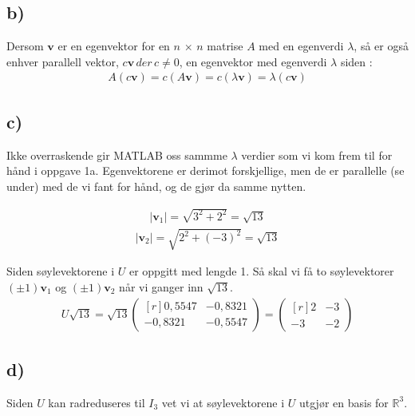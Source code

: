 \documentclass[11pt]{article}
\renewcommand{\vec}[1]{\mathbf{#1}}
\newcommand{\bpm}{\begin{pmatrix*}[r]}
\newcommand{\epm}{\end{pmatrix*}}
\begin{document}
	\subsection*{b)}
		Dersom $\vec{v}$ er en egenvektor for en $n\,\times\,n$ matrise $A$ med en egenverdi $\lambda$, så er også enhver parallell vektor, $c\vec{v} \, der \, c\not=0$, en egenvektor med egenverdi $\lambda$ siden :
		\begin{align*}
			A(c\vec{v}) = c(A\vec{v}) = c(\lambda\vec{v}) = \lambda(c\vec{v})
		\end{align*}
	\subsection*{c)}
		\begin{figure}[H]
			
			
		\end{figure}
		Ikke overraskende gir MATLAB oss sammme $\lambda$ verdier som vi kom frem til for hånd i oppgave 1a. Egenvektorene er derimot forskjellige, men de er parallelle (se under) med de vi fant for hånd, og de gjør da samme nytten.
		\begin{multicols}{2} \noindent
			\begin{align*}
				|\vec{v}_{1}| = \sqrt{3^2+2^2} = \sqrt{13}
			\end{align*}
			\begin{align*}
				|\vec{v}_{2}| = \sqrt{2^2+(-3)^2} = \sqrt{13}
			\end{align*}
		\end{multicols}
			\noindent Siden søylevektorene i $U$ er oppgitt med lengde 1. Så skal vi få to søylevektorer $(\pm1)\vec{v}_{1}$ og $(\pm1)\vec{v}_{2}$ når vi ganger inn $\sqrt{13}$.
		\begin{align*}
			U\sqrt{13} = \sqrt{13} \bpm 0,5547 & -0,8321 \\ -0,8321 & -0,5547 \epm= \bpm 2 & -3 \\ -3 & -2 \epm
		\end{align*}
	\subsection*{d)}
		\begin{figure}[H]
			
			
		\end{figure}
		Siden $U$ kan radreduseres til $I_{3}$ vet vi at søylevektorene i $U$ utgjør en basis for $\mathbb{R}^3$.
\end{document}
